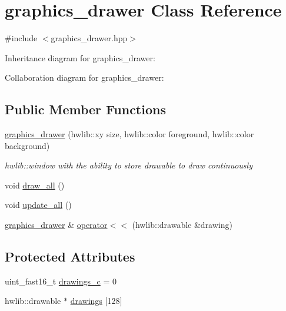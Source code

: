 \hypertarget{classgraphics__drawer}{}\section{graphics\+\_\+drawer Class Reference}
\label{classgraphics__drawer}


{\ttfamily \#include $<$graphics\+\_\+drawer.\+hpp$>$}



Inheritance diagram for graphics\+\_\+drawer\+:


Collaboration diagram for graphics\+\_\+drawer\+:
\subsection*{Public Member Functions}
\begin{DoxyCompactItemize}
\item 
\hyperlink{classgraphics__drawer_a76168c68029e863f1ad09b5dc558719e}{graphics\+\_\+drawer} (hwlib\+::xy size, hwlib\+::color foreground, hwlib\+::color background)
\begin{DoxyCompactList}\small\item\em hwlib\+::window with the ability to store drawable to draw continuously \end{DoxyCompactList}\item 
void \hyperlink{classgraphics__drawer_a6c14eee0dd24900ba8aa924034b1bc60}{draw\+\_\+all} ()
\item 
void \hyperlink{classgraphics__drawer_ac85a6dc3e0ef97fc793f91862e794c47}{update\+\_\+all} ()
\item 
\hyperlink{classgraphics__drawer}{graphics\+\_\+drawer} \& \hyperlink{classgraphics__drawer_a44a2871ef32f5b9acccd7bac7d1137dd}{operator$<$$<$} (hwlib\+::drawable \&drawing)
\end{DoxyCompactItemize}
\subsection*{Protected Attributes}
\begin{DoxyCompactItemize}
\item 
uint\+\_\+fast16\+\_\+t \hyperlink{classgraphics__drawer_a432b568a14d6ce8b746dcce5901714dd}{drawings\+\_\+c} = 0
\item 
hwlib\+::drawable $\ast$ \hyperlink{classgraphics__drawer_ae6341a415f308d7d276d6c36336f2888}{drawings} \mbox{[}128\mbox{]}
\end{DoxyCompactItemize}


